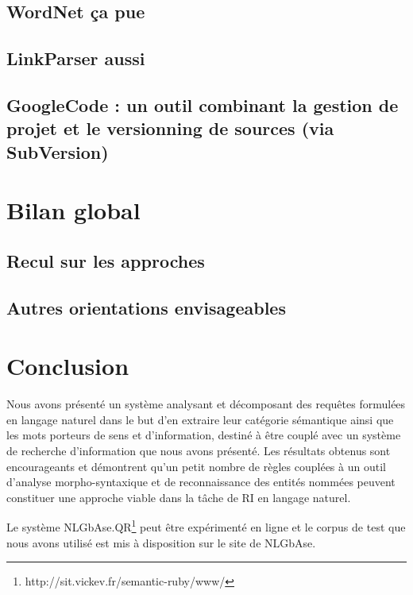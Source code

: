 \documentclass[10pt,a4paper]{article}
\begin{document}
\subsection{WordNet ça pue}
\subsection{LinkParser aussi}
\subsection{GoogleCode : un outil combinant la gestion de projet et le versionning de sources (via SubVersion)}

\section{Bilan global}
\subsection{Recul sur les approches}
\subsection{Autres orientations envisageables}

\section{Conclusion}
\par Nous avons présenté un système analysant et décomposant des requêtes formulées en langage naturel dans le but d'en extraire leur catégorie sémantique ainsi que les mots porteurs de sens et d'information, destiné à être couplé avec un système de recherche d'information que nous avons présenté. Les résultats obtenus sont encourageants et démontrent qu'un petit nombre de règles couplées à un outil d'analyse morpho-syntaxique et de reconnaissance des entités nommées peuvent constituer une approche viable dans la tâche de RI en langage naturel.%
\par Le système NLGbAse.QR\footnote{http://sit.vickev.fr/semantic-ruby/www/} peut être expérimenté en ligne et le corpus de test que nous avons utilisé est mis à disposition sur le site de NLGbAse.




\end{document}
